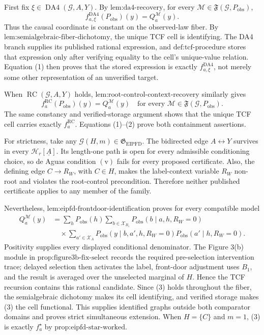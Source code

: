 First fix \(\xi\in\operatorname{DA4}(\mathcal G,A,Y)\). By \(\text{lem:da4-recovery}\), for every \(\mathcal M\in\mathfrak F(\mathcal G,P_{\mathrm{obs}})\),
\[
f^{\mathrm{DA4}}_{a,\xi}(P_{\mathrm{obs}})(y)=Q_a^{\mathcal M}(y).
\tag{1}
\]
Thus the causal coordinate is constant on the observed-law fiber. By \(\text{lem:semialgebraic-fiber-dichotomy}\), the unique TCF cell is identifying. The DA4 branch supplies its published rational expression, and \(\text{def:tcf-procedure}\) stores that expression only after verifying equality to the cell's unique-value relation. Equation (1) then proves that the stored expression is exactly \(f^{\mathrm{DA4}}_{a,\xi}\), not merely some other representation of an unverified target.

When \(\operatorname{RC}(\mathcal G,A,Y)\) holds, \(\text{lem:root-control-context-recovery}\) similarly gives
\[
f_a^{\mathrm{RC}}(P_{\mathrm{obs}})(y)=Q_a^{\mathcal M}(y)
\quad\text{for every }\mathcal M\in\mathfrak F(\mathcal G,P_{\mathrm{obs}}).
\tag{2}
\]
The same constancy and verified-storage argument shows that the unique TCF cell carries exactly \(f_a^{\mathrm{RC}}\). Equations (1)--(2) prove both containment assertions.

For strictness, take any \(\mathcal G(H,m)\in\mathfrak G_{\mathrm{EIPFD}}\). The bidirected edge \(A\leftrightarrow Y\) survives in every \(\mathcal H_r[\underline A]\). Its length-one path is open for every admissible conditioning choice, so de Aguas condition \(\mathrm{(v)}\) fails for every proposed certificate. Also, the defining edge \(C\to R_W\), with \(C\in H\), makes the label-context variable \(R_W\) non-root and violates the root-control precondition. Therefore neither published certificate applies to any member of the family.

Nevertheless, \(\text{lem:eipfd-frontdoor-identification}\) proves for every compatible model
\[
\begin{aligned}
Q_a^{\mathcal M}(y)
&=\sum_hP_{\mathrm{obs}}(h)
\sum_{b\in\mathcal X_{B_1}}P_{\mathrm{obs}}(b\mid a,h,R_W=0)\\
&\quad\times\sum_{a'\in\mathcal X_A}
P_{\mathrm{obs}}(y\mid b,a',h,R_W=0)
P_{\mathrm{obs}}(a'\mid h,R_W=0).
\end{aligned}
\tag{3}
\]
Positivity supplies every displayed conditional denominator. The Figure 3(b) module in \(\text{prop:figure3b-fix-select}\) records the required pre-selection intervention trace; delayed selection then activates the label, front-door adjustment uses \(B_1\), and the result is averaged over the unselected marginal of \(H\). Hence the TCF recursion contains this rational candidate. Since (3) holds throughout the fiber, the semialgebraic dichotomy makes its cell identifying, and verified storage makes (3) the cell functional. This supplies identified graphs outside both comparator domains and proves strict simultaneous extension. When \(H=\{C\}\) and \(m=1\), (3) is exactly \(f_a^\star\) by \(\text{prop:eipfd-star-worked}\).